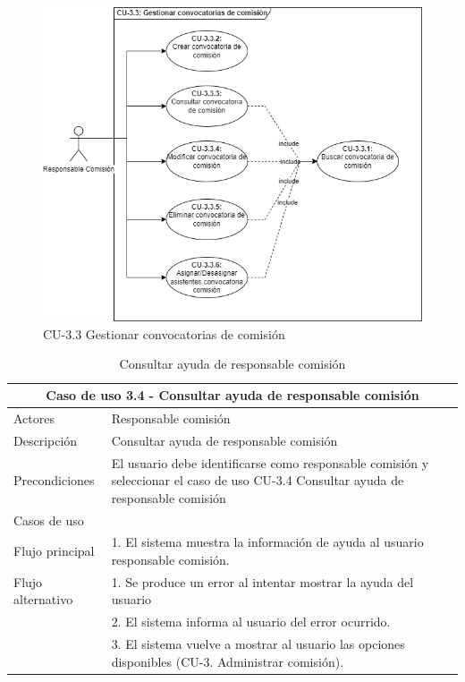 \begin{figure}[H]
        \centering
        \includegraphics[scale=0.55]{img/diagramas/Funcional/CU-3.3.png}
        \caption{CU-3.3 Gestionar convocatorias de comisión}
        \label{fig:Diagrama-Caso de uso 3.3 Gestionar convocatorias de comisión}
    \end{figure}


\begin{table}[H]
    \caption{Consultar ayuda de responsable comisión}
    \label{tab:CU-3.4}
    \begin{center}
        \begin{tabular}{|l|p{12cm}|}
            \hline
            \multicolumn{2}{|c|}{Caso de uso 3.4 - Consultar ayuda de responsable comisión} \\ \hline 
            Actores                 &   Responsable comisión          \\  
            \hline
            Descripción        & Consultar ayuda de responsable comisión    \\ \hline 
            Precondiciones          &   El usuario debe identificarse  como responsable comisión y seleccionar el caso de uso CU-3.4 Consultar ayuda de responsable comisión         \\  \hline
            Casos de uso            &          \\ \hline
            Flujo principal         &   1. El sistema muestra la información de ayuda 
            al usuario responsable comisión.     \\\hline
            Flujo alternativo    &   1. Se produce un error al intentar mostrar la ayuda del usuario \\ 
            & 2. El sistema informa al usuario del error ocurrido. \\ 
            & 3. El sistema vuelve a mostrar al usuario las opciones disponibles (CU-3. Administrar comisión).\\  \hline
        \end{tabular}
    \end{center}
\end{table}

